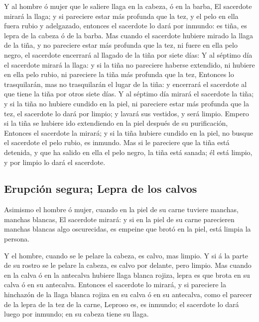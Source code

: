  Y al hombre ó mujer que le saliere llaga en la cabeza, ó
en la barba,  El sacerdote mirará la llaga; y si
pareciere estar más profunda que la tez, y el pelo en ella fuera rubio y
adelgazado, entonces el sacerdote lo dará por inmundo: es tiña, es lepra
de la cabeza ó de la barba.  Mas cuando el sacerdote
hubiere mirado la llaga de la tiña, y no pareciere estar más profunda
que la tez, ni fuere en ella pelo negro, el sacerdote encerrará al
llagado de la tiña por siete días:  Y al séptimo día el
sacerdote mirará la llaga: y si la tiña no pareciere haberse extendido,
ni hubiere en ella pelo rubio, ni pareciere la tiña más profunda que la
tez,  Entonces lo trasquilarán, mas no trasquilarán el
lugar de la tiña: y encerrará el sacerdote al que tiene la tiña por
otros siete días.  Y al séptimo día mirará el sacerdote
la tiña; y si la tiña no hubiere cundido en la piel, ni pareciere estar
más profunda que la tez, el sacerdote lo dará por limpio; y lavará sus
vestidos, y será limpio.  Empero si la tiña se hubiere
ido extendiendo en la piel después de su purificación, 
Entonces el sacerdote la mirará; y si la tiña hubiere cundido en la
piel, no busque el sacerdote el pelo rubio, es inmundo. 
Mas si le pareciere que la tiña está detenida, y que ha salido en ella
el pelo negro, la tiña está sanada; él está limpio, y por limpio lo dará
el sacerdote.

\hypertarget{erupciuxf3n-segura-lepra-de-los-calvos}{%
\subsection{Erupción segura; Lepra de los
calvos}\label{erupciuxf3n-segura-lepra-de-los-calvos}}

 Asimismo el hombre ó mujer, cuando en la piel de su
carne tuviere manchas, manchas blancas,  El sacerdote
mirará: y si en la piel de su carne parecieren manchas blancas algo
oscurecidas, es empeine que brotó en la piel, está limpia la persona.

 Y el hombre, cuando se le pelare la cabeza, es calvo,
mas limpio.  Y si á la parte de su rostro se le pelare la
cabeza, es calvo por delante, pero limpio.  Mas cuando en
la calva ó en la antecalva hubiere llaga blanca rojiza, lepra es que
brota en su calva ó en su antecalva.  Entonces el
sacerdote lo mirará, y si pareciere la hinchazón de la llaga blanca
rojiza en su calva ó en su antecalva, como el parecer de la lepra de la
tez de la carne,  Leproso es, es inmundo; el sacerdote lo
dará luego por inmundo; en su cabeza tiene su llaga.

